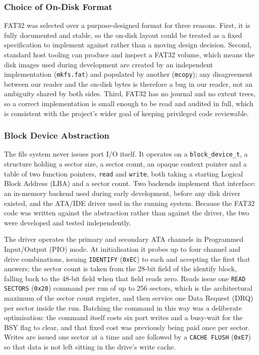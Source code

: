 \subsubsection{Choice of On-Disk Format}

FAT32 was selected over a purpose-designed format for three reasons. First, it
is fully documented and stable, so the on-disk layout could be treated as a
fixed specification to implement against rather than a moving design decision.
Second, standard host tooling can produce and inspect a FAT32 volume, which
means the disk images used during development are created by an independent
implementation (\texttt{mkfs.fat}) and populated by another (\texttt{mcopy});
any disagreement between our reader and the on-disk bytes is therefore a bug in
our reader, not an ambiguity shared by both sides. Third, FAT32 has no journal
and no extent trees, so a correct implementation is small enough to be read and
audited in full, which is consistent with the project's wider goal of keeping
privileged code reviewable.

\subsubsection{Block Device Abstraction}

The file system never issues port I/O itself. It operates on a
\texttt{block\_device\_t}, a structure holding a sector size, a sector count,
an opaque context pointer and a table of two function pointers, \texttt{read}
and \texttt{write}, both taking a starting Logical Block Address (LBA) and a
sector count. Two backends implement that interface: an in-memory backend used
during early development, before any disk driver existed, and the ATA/IDE
driver used in the running system. Because the FAT32 code was written against
the abstraction rather than against the driver, the two were developed and
tested independently.

The driver operates the primary and secondary ATA channels in Programmed
Input/Output (PIO) mode. At initialisation it probes up to four
channel and drive combinations, issuing \texttt{IDENTIFY} (\texttt{0xEC}) to
each and accepting the first that answers; the sector count is taken from the
28-bit field of the identify block, falling back to the 48-bit field when that
field reads zero. Reads issue one \texttt{READ SECTORS} (\texttt{0x20}) command
per run of up to 256 sectors, which is the architectural maximum of the sector
count register, and then service one Data Request (DRQ) per sector inside the
run. Batching the command in this way was a deliberate optimisation: the
command itself costs six port writes and a busy-wait for the BSY flag to clear,
and that fixed cost was previously being paid once per sector. Writes are
issued one sector at a time and are followed by a \texttt{CACHE FLUSH}
(\texttt{0xE7}) so that data is not left sitting in the drive's write cache.

